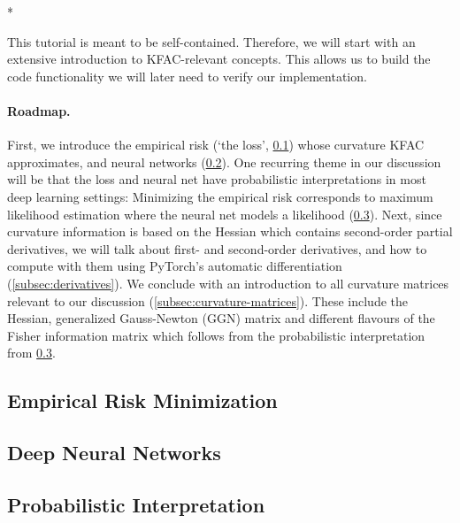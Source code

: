 \switchcolumn[1]*
\switchcolumn[0]

This tutorial is meant to be self-contained.
Therefore, we will start with an extensive introduction to KFAC-relevant concepts.
This allows us to build the code functionality we will later need to verify our implementation.

\paragraph{Roadmap.} First, we introduce the empirical risk (`the loss', \cref{subsec:empirical-risk-minimization}) whose curvature KFAC approximates, and neural networks (\cref{subsec:deep-neural-networks}).
One recurring theme in our discussion will be that the loss and neural net have probabilistic interpretations in most deep learning settings: Minimizing the empirical risk corresponds to maximum likelihood estimation where the neural net models a likelihood (\cref{subsec:probabilistic-interpretation}).
Next, since curvature information is based on the Hessian which contains second-order partial derivatives, we will talk about first- and second-order derivatives, and how to compute with them using PyTorch's automatic differentiation (\cref{subsec:derivatives}).
We conclude with an introduction to all curvature matrices relevant to our discussion (\cref{subsec:curvature-matrices}).
These include the Hessian, generalized Gauss-Newton (GGN) matrix and different flavours of the Fisher information matrix which follows from the probabilistic interpretation from \cref{subsec:probabilistic-interpretation}.

\subsection{Empirical Risk Minimization}\label{subsec:empirical-risk-minimization}


\switchcolumn[1]
\switchcolumn[0]
\subsection{Deep Neural Networks}\label{subsec:deep-neural-networks}


\subsection{Probabilistic Interpretation}\label{subsec:probabilistic-interpretation}


